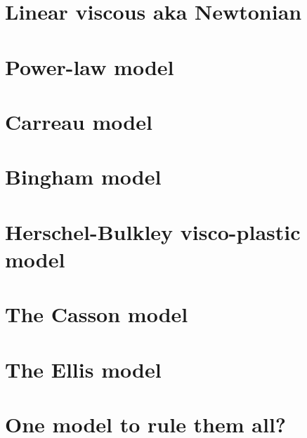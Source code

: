 \section{Linear viscous aka Newtonian} 


\section{Power-law model \label{ss:powerlaw}} 


\section{Carreau model}


\section{Bingham model} \label{sec:bingham}


\section{Herschel-Bulkley visco-plastic model}


\section{The Casson model}


\section{The Ellis model\label{ss:ellis}}


\section{One model to rule them all? \label{ss:cross}}


